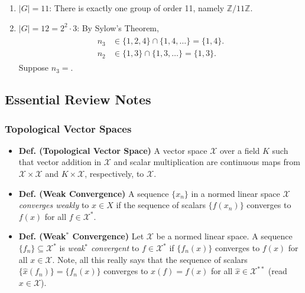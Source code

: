 \documentclass{article}
\begin{document}
\begin{enumerate}[itemsep =-2pt,label = (\arabic{*})]
	\item $|G| = 11$: There is exactly one group of order 11, namely $\mathbb{Z}/11\mathbb{Z}$. 
	\item $|G| = 12 = 2^{2} \cdot 3$: By Sylow's Theorem, 
		\begin{align}
			\begin{split}
				n_{3} &\in \{1, 2, 4\} \cap \{1, 4, \ldots\} = \{1, 4\}. \\
				n_{2} &\in \{1, 3\} \cap \{1, 3, \ldots\} = \{1, 3\}. 
			\end{split}
		\end{align}
	Suppose $n_{3} = $. 
\end{enumerate}


\newpage 
\subsection{Essential Review Notes}
\subsubsection{Topological Vector Spaces}
\begin{itemize}
	\item \textbf{Def. (Topological Vector Space)} A vector space $\mathscr{X}$ over a field $K$ such that vector addition in $\mathscr{X}$ and scalar multiplication are continuous maps from $\mathscr{X} \times \mathscr{X}$ and $K \times \mathscr{X}$, respectively, to $\mathscr{X}$. 
	\item \textbf{Def. (Weak Convergence)} A sequence $\{x_{n}\}$ in a normed linear space $\mathscr{X}$ \textit{converges weakly} to $x \in X$ if the sequence of scalars $\{f(x_{n})\}$ converges to $f(x)$ for all $f \in \mathscr{X}^{\ast}$. 
	\item \textbf{Def. (Weak$^{\ast}$ Convergence)} Let $\mathscr{X}$ be a normed linear space. A sequence $\{f_{n}\} \subseteq \mathscr{X}^{\ast}$ is \textit{weak$^{\ast}$ convergent} to $f \in \mathscr{X}^{\ast}$ if $\{f_{n}(x)\}$ converges to $f(x)$ for all $x \in \mathscr{X}$. Note, all this really says that the sequence of scalars $\{\hat{x}(f_{n})\} = \{f_{n}(x)\}$ converges to $\hat{x}(f) = f(x)$ for all $\hat{x} \in \mathscr{X}^{\ast\ast}$ (read $x \in \mathscr{X}$). 
\end{itemize}
\end{document}
